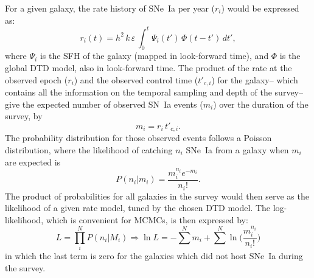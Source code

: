 \documentclass[apj, twocolumn]{aastex62}
\begin{document}
For a given galaxy, the rate history of SNe~Ia per year ($r_i$) would be expressed as:
\begin{equation}
r_i (t) = h^2\,k\,\varepsilon\, \int_0^t \Psi_i(t')\,\Phi(t-t')\,dt',
\label{eqn:rate_history}
\end{equation}
\noindent where $\Psi_i$ is the SFH of the galaxy (mapped in look-forward time), and $\Phi$ is the global DTD model, also in look-forward time. The product of the rate at the observed epoch ($r_i$) and the observed control time ($t'_{c, i}$) for the galaxy-- which contains all the information on the temporal sampling and depth of the survey--  give the expected number of observed SN~Ia events ($m_i$) over the duration of the survey, by
\begin{equation}
m_i = r_i \, t'_{c, i}.
\end{equation}
\noindent The probability distribution for those observed events follows a Poisson distribution, where the likelihood of catching $n_i$ SNe~Ia from a galaxy when $m_i$ are expected is
\begin{equation}
P(n_i | m_i) = \frac{m_i^{n_i}e^{-m_i}}{n_i!}.
\end{equation}
\noindent The product of probabilities for all galaxies in the survey would then serve as the likelihood of a given rate model, tuned by the chosen DTD model. The log-likelihood, which is convenient for MCMCs, is then expressed by:
\begin{equation}
L = \prod _i^N P(n_i|M_i) \Rightarrow \ln L = -\sum^N m_i+\sum^N\ln\biggl(\frac{m_i^{n_i}}{n_i!}\biggr)
\end{equation}
\noindent in which the last term is zero for the galaxies which did not host SNe~Ia during the survey.
\end{document}

